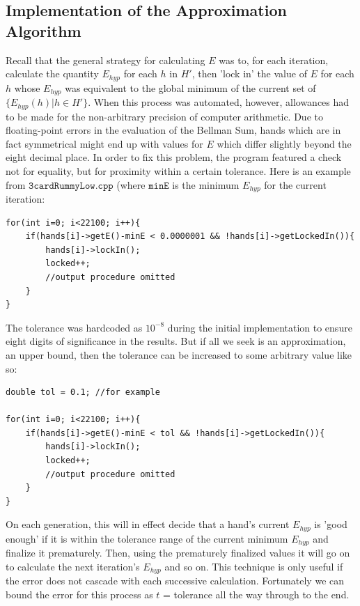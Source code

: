 \documentclass[letter,12pt]{article}
\begin{document}
\subsection{Implementation of the Approximation Algorithm}

Recall that the general strategy for calculating $E$ was to, for each iteration, calculate the quantity $E_{hyp}$ for each $h$ in $H'$, then 'lock in' the value of $E$ for each $h$ whose $E_{hyp}$ was equivalent to the global minimum of the current set of $\{E_{hyp}(h) | h \in H' \}$. When this process was automated, however, allowances had to be made for the non-arbitrary precision of computer arithmetic. Due to floating-point errors in the evaluation of the Bellman Sum, hands which are in fact symmetrical might end up with values for $E$ which differ slightly beyond the eight decimal place. In order to fix this problem, the program featured a check not for equality, but for proximity within a certain tolerance.  Here is an example from $\texttt{3cardRummyLow.cpp}$ (where $\texttt{minE}$ is the minimum $E_{hyp}$ for the current iteration:

\begin{small}
\begin{verbatim}
for(int i=0; i<22100; i++){
    if(hands[i]->getE()-minE < 0.0000001 && !hands[i]->getLockedIn()){
        hands[i]->lockIn();
        locked++;
        //output procedure omitted
    }
}
\end{verbatim}
\end{small}
The tolerance was hardcoded as $10^{-8}$ during the initial implementation to ensure eight digits of significance in the results. But if all we seek is an approximation, an upper bound, then the tolerance can be increased to some arbitrary value like so:

\begin{small}
\begin{verbatim}
double tol = 0.1; //for example

for(int i=0; i<22100; i++){
    if(hands[i]->getE()-minE < tol && !hands[i]->getLockedIn()){
        hands[i]->lockIn();
        locked++;
        //output procedure omitted
    }
}
\end{verbatim}
\end{small}

On each generation, this will in effect decide that a hand's current $E_{hyp}$ is 'good enough' if it is within the tolerance range of the current minimum $E_{hyp}$ and finalize it prematurely. Then, using the prematurely finalized values it will go on to calculate the next iteration's $E_{hyp}$ and so on. This technique is only useful if the error does not cascade with each successive calculation. Fortunately we can bound the error for this process as $t$ = tolerance all the way through to the end.
\end{document}
